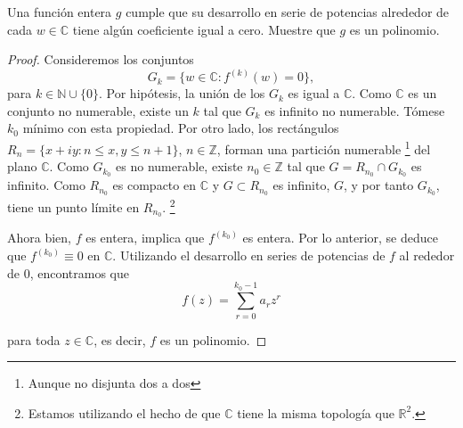 \documentclass[12pt]{article}
\newcommand{\N}{\mathbb{N}}
\newcommand{\Z}{\mathbb{Z}}
\newcommand{\R}{\mathbb{R}}
\newcommand{\C}{\mathbb{C}}
\newenvironment{problem}[2][Problema]{\begin{trivlist}
\item[\hskip \labelsep {\bfseries #1}\hskip \labelsep {\bfseries #2.}]}{\end{trivlist}}
\begin{document}
\begin{problem}{3}
Una función entera $g$ cumple que su desarrollo en serie de potencias alrededor de cada $w \in \C$ tiene algún coeficiente igual a cero. Muestre que $g$ es un polinomio.
\end{problem}
\begin{proof}
Consideremos los conjuntos 
$$ G_k = \{w \in \C: f^{(k)}(w) = 0\},$$
para $k \in \N \cup \{0\}$. Por hipótesis, la unión de los $G_k$ es igual a $\C$. Como $\C$ es un conjunto no numerable, existe un $k$ tal que $G_k$ es infinito no numerable. Tómese $k_0$ mínimo con esta propiedad.
Por otro lado, los rectángulos $R_n = \{x + iy: n \leq x,y \leq n+1\}$, $n \in \Z$, forman una partición numerable \footnote{Aunque no disjunta dos a dos} del plano $\C$. Como $G_{k_0}$ es no numerable, existe $n_0 \in \Z$ tal que $G = R_{n_0} \cap G_{k_0}$ es infinito. Como $R_{n_0}$ es compacto en $\C$ y $G \subset R_{n_0}$ es infinito, $G$, y por tanto $G_{k_0}$, tiene un punto límite en $R_{n_0}$. \footnote{Estamos utilizando el hecho de que $\C$ tiene la misma topología que $\R^2$.} 

Ahora bien, $f$ es entera, implica que $f^{(k_0)}$ es entera. Por lo anterior, se deduce que $f^{(k_0)} \equiv 0$ en $\C$. Utilizando el desarrollo en series de potencias de $f$ al rededor de $0$, encontramos que 
$$ f(z) = \sum_{r=0}^{k_0 - 1} a_r z^r $$

para toda $z \in \C$, es decir, $f$ es un polinomio.

\end{proof}
\end{document}
